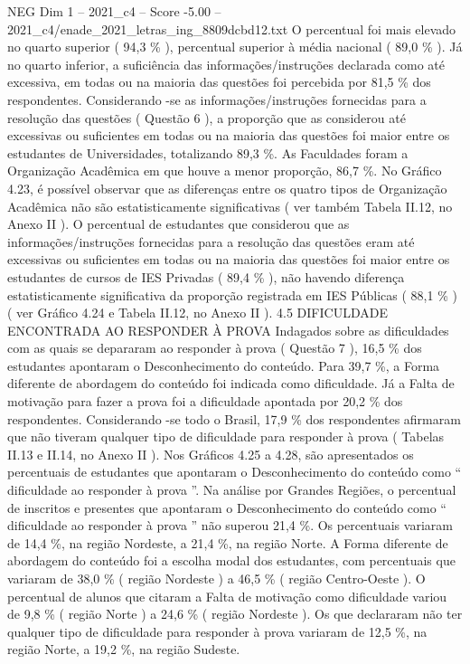\begin{textsample}{NEG Dim 1 – 2021\_c4 – Score -5.00 – 2021\_c4/enade\_2021\_letras\_ing\_8809dcbd12.txt}
O percentual foi mais elevado no quarto superior ( 94,3 \% ), percentual superior à média nacional ( 89,0 \% ).
Já no quarto inferior, a suficiência das informações/instruções declarada como até excessiva, em todas ou na maioria das questões foi percebida por 81,5 \% dos respondentes.
Considerando -se as informações/instruções fornecidas para a resolução das questões ( Questão 6 ), a proporção que as considerou até excessivas ou suficientes em todas ou na maioria das questões foi maior entre os estudantes de Universidades, totalizando 89,3 \%.
As Faculdades foram a Organização Acadêmica em que houve a menor proporção, 86,7 \%.
No Gráfico 4.23, é possível observar que as diferenças entre os quatro tipos de Organização Acadêmica não são estatisticamente significativas ( ver também Tabela II.12, no Anexo II ).
O percentual de estudantes que considerou que as informações/instruções fornecidas para a resolução das questões eram até excessivas ou suficientes em todas ou na maioria das questões foi maior entre os estudantes de cursos de IES Privadas ( 89,4 \% ), não havendo diferença estatisticamente significativa da proporção registrada em IES Públicas ( 88,1 \% ) ( ver Gráfico 4.24 e Tabela II.12, no Anexo II ). 4.5 DIFICULDADE ENCONTRADA AO RESPONDER À PROVA Indagados sobre as dificuldades com as quais se depararam ao responder à prova ( Questão 7 ), 16,5 \% dos estudantes apontaram o Desconhecimento do conteúdo.
Para 39,7 \%, a Forma diferente de abordagem do conteúdo foi indicada como dificuldade.
Já a Falta de motivação para fazer a prova foi a dificuldade apontada por 20,2 \% dos respondentes.
Considerando -se todo o Brasil, 17,9 \% dos respondentes afirmaram que não tiveram qualquer tipo de dificuldade para responder à prova ( Tabelas II.13 e II.14, no Anexo II ).
Nos Gráficos 4.25 a 4.28, são apresentados os percentuais de estudantes que apontaram o Desconhecimento do conteúdo como “ dificuldade ao responder à prova ”.
Na análise por Grandes Regiões, o percentual de inscritos e presentes que apontaram o Desconhecimento do conteúdo como “ dificuldade ao responder à prova ” não superou 21,4 \%.
Os percentuais variaram de 14,4 \%, na região Nordeste, a 21,4 \%, na região Norte.
A Forma diferente de abordagem do conteúdo foi a escolha modal dos estudantes, com percentuais que variaram de 38,0 \% ( região Nordeste ) a 46,5 \% ( região Centro-Oeste ).
O percentual de alunos que citaram a Falta de motivação como dificuldade variou de 9,8 \% ( região Norte ) a 24,6 \% ( região Nordeste ).
Os que declararam não ter qualquer tipo de dificuldade para responder à prova variaram de 12,5 \%, na região Norte, a 19,2 \%, na região Sudeste.

\end{textsample}
